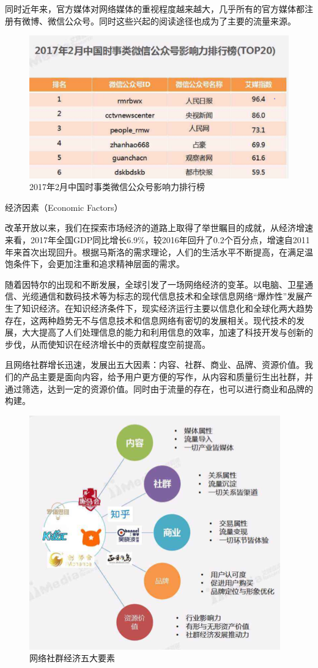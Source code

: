 \documentclass[10pt,letterpaper]{article}
\begin{document}
同时近年来，官方媒体对网络媒体的重视程度越来越大，几乎所有的官方媒体都注册有微博、微信公众号。同时这些兴起的阅读途径也成为了主要的流量来源。

\begin{figure}[H]
	\begin{center}
		\includegraphics[width=0.5\linewidth]{___14.png}
		\caption{2017年2月中国时事类微信公众号影响力排行榜}
		\label{Fig:1}
	\end{center}
	\vspace{-0.5em}
\end{figure}

经济因素（Economic Factors）

改革开放以来，我们在探索市场经济的道路上取得了举世瞩目的成就，从经济增速来看，2017年全国GDP同比增长6.9\%，较2016年回升了0.2个百分点，增速自2011年来首次出现回升。根据马斯洛的需求理论，人们的生活水平不断提高，在满足温饱条件下，会更加注重和追求精神层面的需求。

随着因特尔的出现和不断发展，全球引发了一场网络经济的变革。以电脑、卫星通信、光缆通信和数码技术等为标志的现代信息技术和全球信息网络“爆炸性”发展产生了知识经济。在知识经济条件下，现实经济运行主要以信息化和全球化两大趋势存在，这两种趋势无不与信息技术和信息网络有密切的发展相关。现代技术的发展，大大提高了人们处理信息的能力和利用信息的效率，加速了科技开发与创新的步伐，从而使知识在经济增长中的贡献程度空前提高。

且网络社群增长迅速，发展出五大因素：内容、社群、商业、品牌、资源价值。我们的产品主要是面向内容，给予用户更方便的写作，从内容和质量衍生出社群，并通过筛选，达到一定的资源价值。同时由于流量的存在，也可以进行商业和品牌的构建。

\begin{figure}[H]
	\begin{center}
		\includegraphics[width=0.5\linewidth]{___15.png}
		\caption{网络社群经济五大要素}
		\label{Fig:1}
	\end{center}
	\vspace{-0.5em}
\end{figure}
\end{document}
